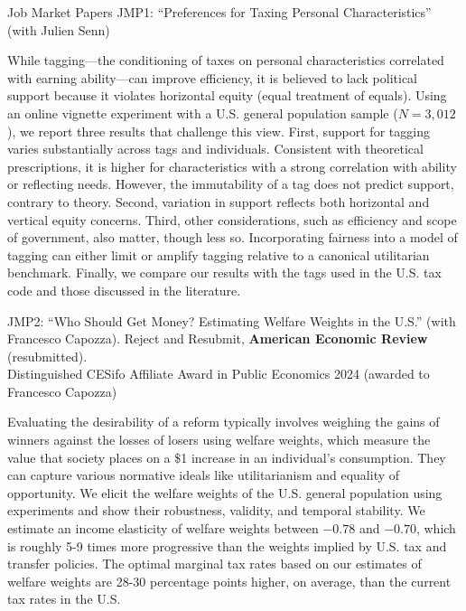\documentclass{resume} %
\begin{document}
\begin{rSection}{Job Market Papers}
  JMP1: ``Preferences for Taxing Personal Characteristics'' (with Julien Senn)

While tagging---the conditioning of taxes on personal characteristics correlated with earning ability---can improve efficiency, it is believed to lack political support because it violates horizontal equity (equal treatment of equals). Using an online vignette experiment with a U.S. general population sample ($N=3{,}012$), we report three results that challenge this view. First, support for tagging varies substantially across tags and individuals. Consistent with theoretical prescriptions, it is higher for characteristics with a strong correlation with ability or reflecting needs. However, the immutability of a tag does not predict support, contrary to theory. Second, variation in support reflects both horizontal and vertical equity concerns. Third, other considerations, such as efficiency and scope of government, also matter, though less so. Incorporating fairness into a model of tagging can either limit or amplify tagging relative to a canonical utilitarian benchmark. Finally, we compare our results with the tags used in the U.S. tax code and those discussed in the literature.

  JMP2:   ``Who Should Get Money? Estimating Welfare Weights in the U.S.'' (with Francesco Capozza). Reject and Resubmit, \textbf{American Economic Review} (resubmitted). \\ \vspace{0.6em}
  { \normalsize  \hspace*{0.6em} Distinguished CESifo Affiliate Award in Public Economics 2024 (awarded to Francesco Capozza)} 

  Evaluating the desirability of a reform typically involves weighing the gains of winners against the losses of losers using welfare weights, which measure the value that society places on a \$1 increase in an individual's consumption. They can capture various normative ideals like utilitarianism and equality of opportunity. We elicit the welfare weights of the U.S. general population using experiments and show their robustness, validity, and temporal stability. We estimate an income elasticity of welfare weights between $-0.78$ and $-0.70$, which is roughly 5-9 times more progressive than the weights implied by U.S. tax and transfer policies. The optimal marginal tax rates based on our estimates of welfare weights are 28-30 percentage points higher, on average, than the current tax rates in the U.S.
\end{rSection}
\end{document}
